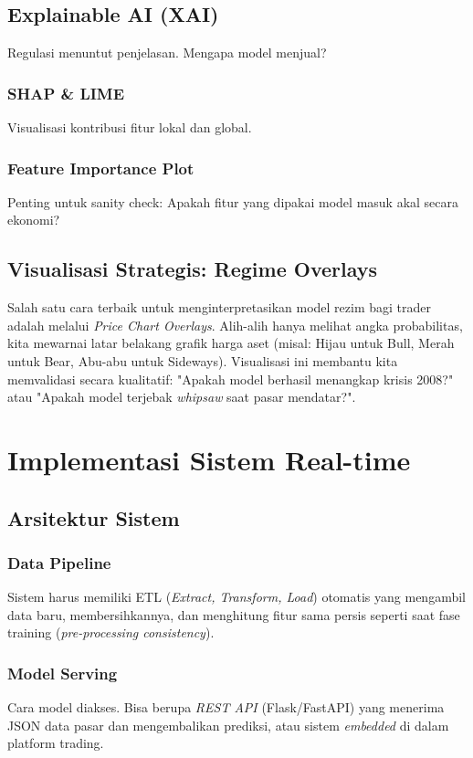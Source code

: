 \documentclass[12pt,a4paper]{book}
\begin{document}
\section{Explainable AI (XAI)}
Regulasi menuntut penjelasan. Mengapa model menjual? 
\subsection{SHAP & LIME}
Visualisasi kontribusi fitur lokal dan global.
\subsection{Feature Importance Plot}
Penting untuk sanity check: Apakah fitur yang dipakai model masuk akal secara ekonomi?

\section{Visualisasi Strategis: Regime Overlays}
Salah satu cara terbaik untuk menginterpretasikan model rezim bagi trader adalah melalui \textit{Price Chart Overlays}. Alih-alih hanya melihat angka probabilitas, kita mewarnai latar belakang grafik harga aset (misal: Hijau untuk Bull, Merah untuk Bear, Abu-abu untuk Sideways). Visualisasi ini membantu kita memvalidasi secara kualitatif: "Apakah model berhasil menangkap krisis 2008?" atau "Apakah model terjebak \textit{whipsaw} saat pasar mendatar?".

\chapter{Implementasi Sistem Real-time}
\section{Arsitektur Sistem}
\subsection{Data Pipeline}
Sistem harus memiliki ETL (\textit{Extract, Transform, Load}) otomatis yang mengambil data baru, membersihkannya, dan menghitung fitur sama persis seperti saat fase training (\textit{pre-processing consistency}).

\subsection{Model Serving}
Cara model diakses. Bisa berupa \textit{REST API} (Flask/FastAPI) yang menerima JSON data pasar dan mengembalikan prediksi, atau sistem \textit{embedded} di dalam platform trading.
\end{document}
